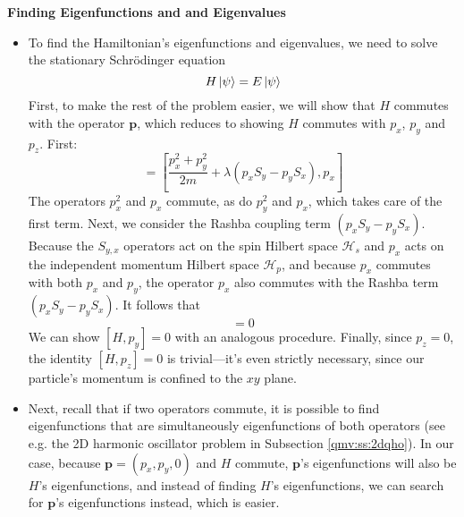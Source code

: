 \documentclass[11pt, a4paper]{article}
\newcommand{\Schro}{Schr\"{o}dinger\xspace}
\renewcommand{\vec}[1]{\bm{#1}} %
\renewcommand{\H}{\mathcal{H}}  %
\begin{document}
\textbf{Finding Eigenfunctions and and Eigenvalues}
\begin{itemize}
	
	\item To find the Hamiltonian's eigenfunctions and eigenvalues, we need to solve the stationary \Schro equation
	\begin{equation*}
		H \ket{\psi} = E \ket{\psi}
	\end{equation*}
	First, to make the rest of the problem easier, we will show that $ H $ commutes with the operator $ \vec{p} $, which reduces to showing $ H $ commutes with $ p_{x}$, $ p_{y} $ and $ p_{z} $. First:
	\begin{equation*}
		[H, p_{x}] = \left[\frac{p_{x}^{2} + p_{y}^{2}}{2m} + \lambda (p_{x}S_{y} - p_{y}S_{x}), p_{x}\right]
	\end{equation*}
	The operators $ p_{x}^{2} $ and $ p_{x} $ commute, as do $ p_{y}^{2} $ and $ p_{x} $, which takes care of the first term. Next, we consider the Rashba coupling term $ (p_{x}S_{y} - p_{y}S_{x}) $. Because the $ S_{y, x} $ operators act on the spin Hilbert space $ \H_{s} $ and $ p_{x} $ acts on the independent momentum Hilbert space $ \H_{p} $, and because $ p_{x} $ commutes with both $ p_{x} $ and $ p_{y}$, the operator $ p_{x} $ also commutes with the Rashba term $ (p_{x}S_{y} - p_{y}S_{x}) $. It follows that
	\begin{equation*}
		[H, p_{x}] = 0
	\end{equation*}
	We can show $ [H, p_{y}] = 0 $ with an analogous procedure. Finally, since $ p_{z} = 0 $, the identity $ [H, p_{z}] = 0 $ is trivial---it's even strictly necessary, since our particle's momentum is confined to the $ xy $ plane.
	
	\item Next, recall that if two operators commute, it is possible to find eigenfunctions that are simultaneously eigenfunctions of both operators (see e.g. the 2D harmonic oscillator problem in Subsection \ref{qmv:ss:2dqho}). In our case, because $ \vec{p} = (p_{x}, p_{y}, 0)$ and $ H $ commute, $ \vec{p} $'s eigenfunctions will also be $ H $'s eigenfunctions, and instead of finding $ H $'s eigenfunctions, we can search for $ \vec{p} $'s eigenfunctions instead, which is easier.
	

\end{itemize}
\end{document}
